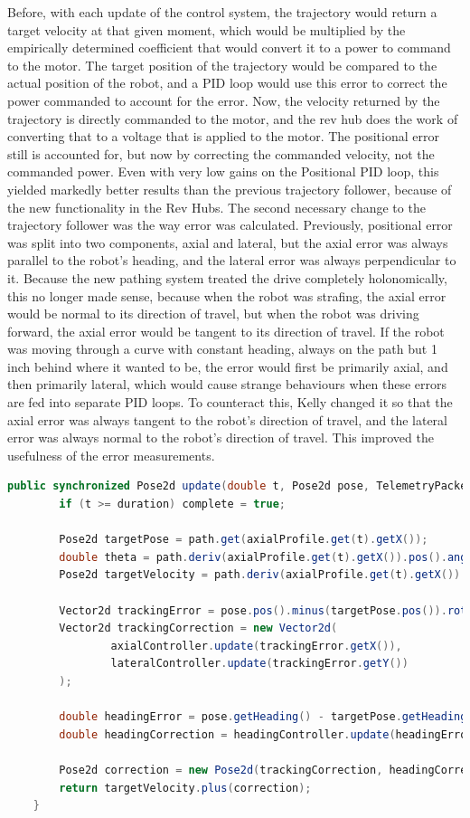 \documentclass{article}
\begin{document}
Before, with each update of the control system, the trajectory would return a target velocity at that given moment, which would be multiplied by the empirically determined coefficient that would convert it to a power to command to the motor. The target position of the trajectory would be compared to the actual position of the robot, and a PID loop would use this error to correct the power commanded to account for the error. Now, the velocity returned by the trajectory is directly commanded to the motor, and the rev hub does the work of converting that to a voltage that is applied to the motor. The positional error still is accounted for, but now by correcting the commanded velocity, not the commanded power. Even with very low gains on the Positional PID loop, this yielded markedly better results than the previous trajectory follower, because of the new functionality in the Rev Hubs. The second necessary change to the trajectory follower was the way error was calculated. Previously, positional error was split into two components, axial and lateral, but the axial error was always parallel to the robot's heading, and the lateral error was always perpendicular to it. Because the new pathing system treated the drive completely holonomically, this no longer made sense, because when the robot was strafing, the axial error would be normal to its direction of travel, but when the robot was driving forward, the axial error would be tangent to its direction of travel. If the robot was moving through a curve with constant heading, always on the path but 1 inch behind where it wanted to be, the error would first be primarily axial, and then primarily lateral, which would cause strange behaviours when these errors are fed into separate PID loops. To counteract this, Kelly changed it so that the axial error was always tangent to the robot's direction of travel, and the lateral error was always normal to the robot's direction of travel. This improved the usefulness of the error measurements.

\begin{lstlisting}[language=Java]
public synchronized Pose2d update(double t, Pose2d pose, TelemetryPacket packet) {
        if (t >= duration) complete = true;
        
        Pose2d targetPose = path.get(axialProfile.get(t).getX());
        double theta = path.deriv(axialProfile.get(t).getX()).pos().angle();
        Pose2d targetVelocity = path.deriv(axialProfile.get(t).getX()).times(axialProfile.get(t).getV());

        Vector2d trackingError = pose.pos().minus(targetPose.pos()).rotated(-theta);
        Vector2d trackingCorrection = new Vector2d(
                axialController.update(trackingError.getX()),
                lateralController.update(trackingError.getY())
        );

        double headingError = pose.getHeading() - targetPose.getHeading();
        double headingCorrection = headingController.update(headingError);

        Pose2d correction = new Pose2d(trackingCorrection, headingCorrection);
        return targetVelocity.plus(correction);
    }
\end{lstlisting}
\end{document}
